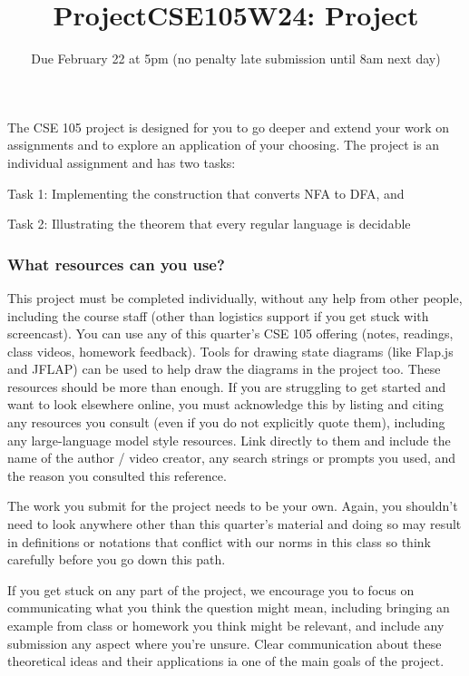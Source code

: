 \documentclass[12pt, oneside]{article}
\begin{document}
\title{ProjectCSE105W24: Project}
\date{Due February 22 at 5pm (no penalty late submission until 8am next day)}


\maketitle

\thispagestyle{fancy}


The CSE 105 project is designed for you to go deeper and extend your work on assignments 
and to explore an application of your choosing. 
The project is an individual assignment and has two tasks: 

Task 1: Implementing the construction that converts NFA to DFA, and

Task 2: Illustrating the theorem that every regular language is decidable


\subsubsection*{What resources can you use?} This project must be completed individually, 
without any help from other people, including the course staff (other than logistics support if 
you get stuck with screencast).
You can use any of this quarter's CSE 105 offering (notes, readings, class videos, homework feedback). 
Tools for drawing state diagrams (like Flap.js and JFLAP) can be used to help draw the diagrams 
in the project too.
These resources should be more than enough.
If you are struggling to get started and want to look elsewhere online, 
you must acknowledge this by listing and citing any resources you consult 
(even if you do not explicitly quote them), including any large-language model style resources. 
Link directly to them and include the name of the author / video creator, 
any search strings or prompts you used, and the reason you consulted this reference.

The work you submit for the project needs to be your own. Again, you shouldn't need to look anywhere 
other than this quarter's material and doing so may result in definitions or notations that 
conflict with our norms in this class so think carefully before you go down this path.

If you get stuck on any part of the project, we encourage you to focus on communicating what you think 
the question might mean, including bringing an example from class or homework you think might be relevant, and 
include any submission any aspect where you're unsure. Clear communication about these
theoretical ideas and their applications ia one of the main goals of the project.
\end{document}
